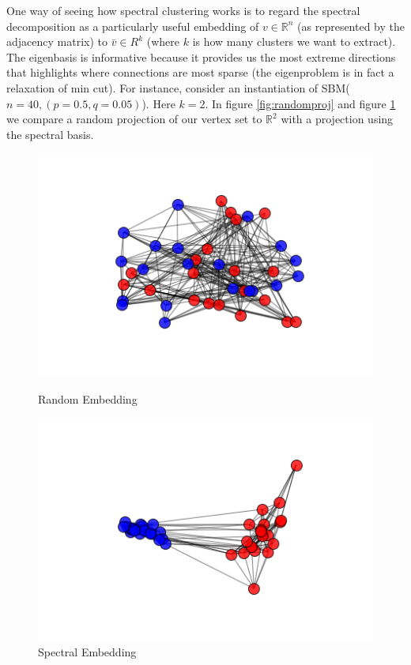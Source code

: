 One way of seeing how spectral clustering works is to regard the spectral decomposition as a particularly useful embedding of $v \in \mathbb{R}^n$ (as represented by the adjacency matrix) to $\bar{v} \in R^k$ (where $k$ is how many clusters we want to extract).  The eigenbasis is informative because it provides us the most extreme directions that highlights where connections are most sparse (the eigenproblem is in fact a relaxation of min cut).  For instance, consider an instantiation of SBM($n =40, (p = 0.5, q = 0.05)$).  Here $k = 2$.  In figure \ref{fig:randomproj} and figure \ref{fig:spectralproj} we compare a random projection of our vertex set to $\mathbb{R}^2$ with a projection using the spectral basis.  

\begin{figure}[h]
  \includegraphics[scale=0.6]{SBM_balanced_large_dense_rand.png}
  \caption{Random Embedding}
  \label{fig:randomproj}
\endminipage\hfill
{}
  \includegraphics[scale=0.6]{SBM_balanced_large_dense_spectral.png}
  \caption{Spectral Embedding}
  \label{fig:spectralproj}
\endminipage\hfill
\end{figure}


